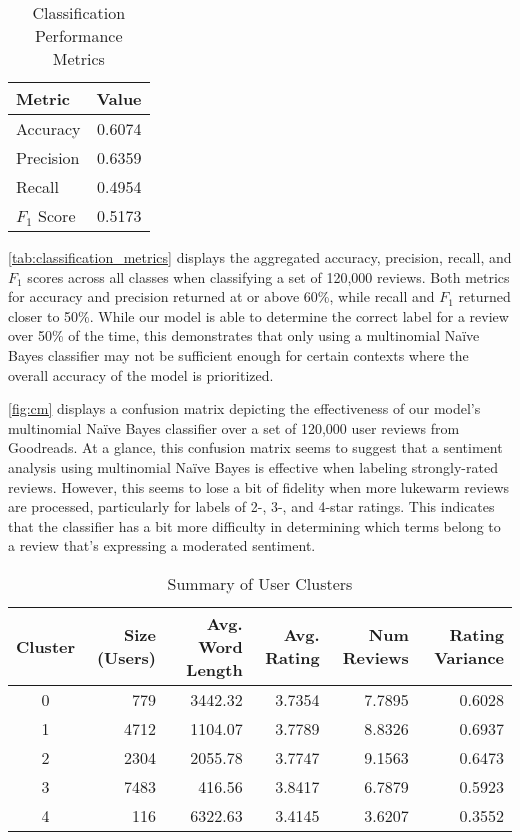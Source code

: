 \begin{table}[h]
	\renewcommand{\arraystretch}{1.3}
	\caption{Classification Performance Metrics}
	\label{tab:classification_metrics}
	\centering
	\begin{tabular}{l r}
		\hline
		\textbf{Metric} & \textbf{Value} \\
		\hline
		Accuracy  & 0.6074 \\
		Precision & 0.6359 \\
		Recall    & 0.4954 \\
		\(F_1\) Score  & 0.5173 \\
		\hline
	\end{tabular}
\end{table}

\autoref{tab:classification_metrics} displays the aggregated accuracy, precision, recall, and \(F_1\) scores across all classes when classifying a set of 120,000 reviews.
Both metrics for accuracy and precision returned at or above 60\%, while recall and \(F_1\) returned closer to 50\%.
While our model is able to determine the correct label for a review over 50\% of the time,
this demonstrates that only using a multinomial Na\"ive Bayes classifier may not be sufficient enough for certain contexts where
the overall accuracy of the model is prioritized.

\autoref{fig:cm} displays a confusion matrix depicting the effectiveness of our model's multinomial Na\"ive Bayes classifier over a set of 120,000 user reviews from Goodreads.
At a glance, this confusion matrix seems to suggest that a sentiment analysis using multinomial Na\"ive Bayes is effective when labeling strongly-rated reviews.
However, this seems to lose a bit of fidelity when more lukewarm reviews are processed, particularly for labels of 2-, 3-, and 4-star ratings. This indicates that the classifier has a bit more difficulty in determining which terms belong to a review that's expressing a moderated sentiment.

\begin{table*}[!t]
	\renewcommand{\arraystretch}{1.3}
	\caption{Summary of User Clusters}
	\label{tab:user_clusters}
	\centering
	\begin{tabular}{c r r r r r}
		\hline
		\textbf{Cluster} & \textbf{Size (Users)} & \textbf{Avg. Word Length} & \textbf{Avg. Rating} & \textbf{Num Reviews} & \textbf{Rating Variance} \\
		\hline
		0 & 779  & 3442.32 & 3.7354 & 7.7895 & 0.6028 \\
		1 & 4712 & 1104.07 & 3.7789 & 8.8326 & 0.6937 \\
		2 & 2304 & 2055.78 & 3.7747 & 9.1563 & 0.6473 \\
		3 & 7483 &  416.56 & 3.8417 & 6.7879 & 0.5923 \\
		4 & 116  & 6322.63 & 3.4145 & 3.6207 & 0.3552 \\
		\hline
	\end{tabular}
\end{table*}

